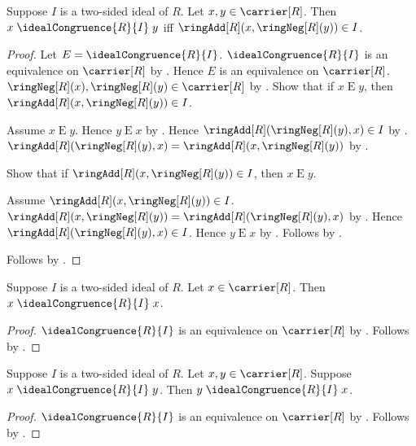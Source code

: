 \begin{proposition}\label{ideal_congruence_iff_add_neg}
    Suppose $I$ is a two-sided ideal of $R$.
    Let $x,y\in\carrier[R]$.
    Then $x\mathrel{\idealCongruence{R}{I}}y$ iff
        $\ringAdd[R](x,\ringNeg[R](y))\in I$.
\end{proposition}
\begin{proof}
    Let $E=\idealCongruence{R}{I}$.
    $\idealCongruence{R}{I}$ is an equivalence on $\carrier[R]$ by
        .
    Hence $E$ is an equivalence on $\carrier[R]$.
    $\ringNeg[R](x),\ringNeg[R](y)\in\carrier[R]$ by
        .
    Show that if $x\mathrel{E}y$, then
        $\ringAdd[R](x,\ringNeg[R](y))\in I$.
    \begin{subproof}
        Assume $x\mathrel{E}y$.
        Hence $y\mathrel{E}x$ by .
        Hence $\ringAdd[R](\ringNeg[R](y),x)\in I$ by
            .
        $\ringAdd[R](\ringNeg[R](y),x)=
            \ringAdd[R](x,\ringNeg[R](y))$ by
            .
    \end{subproof}
    Show that if $\ringAdd[R](x,\ringNeg[R](y))\in I$, then
        $x\mathrel{E}y$.
    \begin{subproof}
        Assume $\ringAdd[R](x,\ringNeg[R](y))\in I$.
        $\ringAdd[R](x,\ringNeg[R](y))=
            \ringAdd[R](\ringNeg[R](y),x)$ by
            .
        Hence $\ringAdd[R](\ringNeg[R](y),x)\in I$.
        Hence $y\mathrel{E}x$ by
            .
        Follows by .
    \end{subproof}
    Follows by \auto.
\end{proof}

\begin{proposition}\label{ideal_congruence_reflexive}
    Suppose $I$ is a two-sided ideal of $R$.
    Let $x\in\carrier[R]$.
    Then $x\mathrel{\idealCongruence{R}{I}}x$.
\end{proposition}
\begin{proof}
    $\idealCongruence{R}{I}$ is an equivalence on $\carrier[R]$ by
        .
    Follows by .
\end{proof}

\begin{proposition}\label{ideal_congruence_symmetric}
    Suppose $I$ is a two-sided ideal of $R$.
    Let $x,y\in\carrier[R]$.
    Suppose $x\mathrel{\idealCongruence{R}{I}}y$.
    Then $y\mathrel{\idealCongruence{R}{I}}x$.
\end{proposition}
\begin{proof}
    $\idealCongruence{R}{I}$ is an equivalence on $\carrier[R]$ by
        .
    Follows by .
\end{proof}

